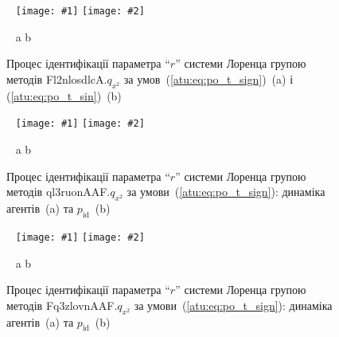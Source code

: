 \documentclass[14pt,handout,utf8]{beamer}
\newcommand{\ABlbl}{%
  \vspace{-2.7ex}
  \begin{center}
    ~ \hfill a \hfill\hfill b \hfill ~
  \end{center}
  \vspace{-2.0ex}
}
\newcommand{\PicDoubleS}[2]{%
 \begin{center}
    ~ \hfill
    \texttt{[image: \#1]}
    \hfill
    \texttt{[image: \#2]}
    \hfill ~
  \end{center}
  \ABlbl
}
\begin{document}
\begin{frame}
  \frametitle{~}

  \begin{figure}[htb!]
    \PicDoubleS{../p5/p/cha/lor/Fl2nlosdlcA/Fl2nlosdlcA-p_xz_1_wp009.png}{../p5/p/cha/lor/Fl2nlosdlcA/Fl2nlosdlcA-p_xz_0_wp009.png}
    \caption{Процес ідентифікації параметра ``$r$'' системи Лоренца групою методів Fl2nlosdlcA.$q_{x^2} $ за умов~(\ref{atu:eq:po_t_sign})~(a) і (\ref{atu:eq:po_t_sin})~(b)}
    \label{atu:f:lor_id_Fl2nlosdlcA_wp009}
  \end{figure}

  \begin{figure}[htb!]
    \PicDoubleS{../p5/p/cha/lor/ql3ruonAAF/lor_ql3ruonAAF_qy2-p_t_pi_sign.png}{../p5/p/cha/lor/ql3ruonAAF/lor_ql3ruonAAF_qy2-p_t_pz_sign.png}
    \caption{Процес ідентифікації параметра ``$r$'' системи Лоренца групою методів ql3ruonAAF.$q_{x^2} $ за умови~(\ref{atu:eq:po_t_sign}): динаміка агентів~(a) та $p_\mathrm{id}$~(b)}
    \label{atu:f:lor_id_ql3ruonAAF.q_x2_sign}
  \end{figure}


  \begin{figure}[htb!]
    \PicDoubleS{../p5/p/cha/lor/Fq3zlovnAAF/lor_Fq3zlovnAAF_qx2-pl_n_sign.png}{../p5/p/cha/lor/Fq3zlovnAAF/lor_Fq3zlovnAAF_qx2-p_p_sign.png}
    \caption{Процес ідентифікації параметра ``$r$'' системи Лоренца групою методів Fq3zlovnAAF.$q_{x^2} $ за умови~(\ref{atu:eq:po_t_sign}): динаміка агентів~(a) та $p_\mathrm{id}$~(b)}
    \label{atu:f:lor_id_Fq3zlovnAAF.q_x2_sign}
  \end{figure}


\end{frame}


\end{document}
